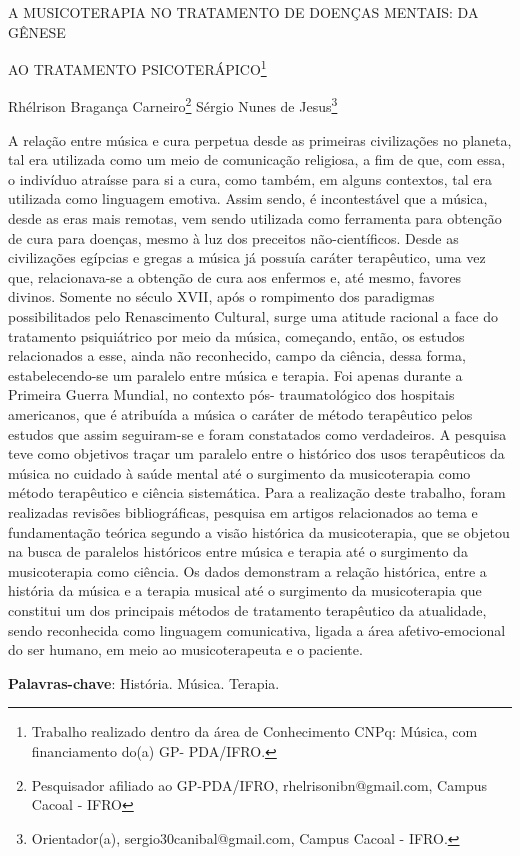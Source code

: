 \documentclass[article,12pt,onesidea,4paper,english,brazil]{abntex2}
\begin{document}
	
	
	\frenchspacing 
	
	\begin{center}
		\LARGE A MUSICOTERAPIA NO TRATAMENTO DE DOENÇAS MENTAIS: DA GÊNESE
		
		AO TRATAMENTO PSICOTERÁPICO\footnote{Trabalho realizado dentro da área de Conhecimento CNPq: Música, com financiamento do(a) GP-
			PDA/IFRO.}
		
		\normalsize
		Rhélrison Bragança Carneiro\footnote{Pesquisador afiliado ao GP-PDA/IFRO, rhelrisonibn@gmail.com, Campus Cacoal - IFRO} 
		Sérgio Nunes de Jesus\footnote{Orientador(a), sergio30canibal@gmail.com, Campus Cacoal - IFRO.} 
	
	\end{center}
	
	\noindent A relação entre música e cura perpetua desde as primeiras civilizações no planeta, tal era utilizada como um meio de comunicação religiosa, a fim de que, com essa, o indivíduo atraísse para si a cura, como também, em alguns contextos, tal era utilizada como linguagem emotiva. Assim sendo, é incontestável que a música, desde as eras mais remotas, vem sendo utilizada como ferramenta para obtenção de cura para doenças, mesmo à luz dos preceitos não-científicos. 
	Desde as civilizações egípcias e gregas a música já possuía caráter terapêutico, uma vez que, relacionava-se a obtenção de cura aos enfermos e, até mesmo, favores divinos.
	Somente no século XVII, após o rompimento dos paradigmas possibilitados pelo Renascimento Cultural, surge uma atitude racional a face do tratamento psiquiátrico por meio da música, começando, então, os estudos relacionados a esse, ainda não reconhecido, campo da ciência, dessa forma, estabelecendo-se um paralelo entre música e terapia. 
	Foi apenas durante a Primeira Guerra Mundial, no contexto pós- traumatológico dos hospitais americanos, que é atribuída a música o caráter de método terapêutico pelos estudos que assim seguiram-se e foram constatados como verdadeiros. 
	A pesquisa teve como objetivos traçar um paralelo entre o histórico dos usos terapêuticos da música no cuidado à saúde mental até o surgimento da musicoterapia como método terapêutico e ciência sistemática. Para a realização deste trabalho, foram realizadas revisões bibliográficas, pesquisa em artigos relacionados ao tema e fundamentação teórica segundo a visão histórica da musicoterapia, que se objetou na busca de paralelos históricos entre música e terapia até o surgimento da musicoterapia como ciência. 
	Os dados demonstram a relação histórica, entre a história da música e a terapia musical até o surgimento da musicoterapia que constitui um dos principais métodos de tratamento terapêutico da atualidade, sendo reconhecida como linguagem comunicativa, ligada a área afetivo-emocional do ser humano, em meio ao musicoterapeuta e o paciente.
	
	\vspace{\onelineskip}
	
	\noindent
	\textbf{Palavras-chave}: História. Música. Terapia.
	
\end{document}
